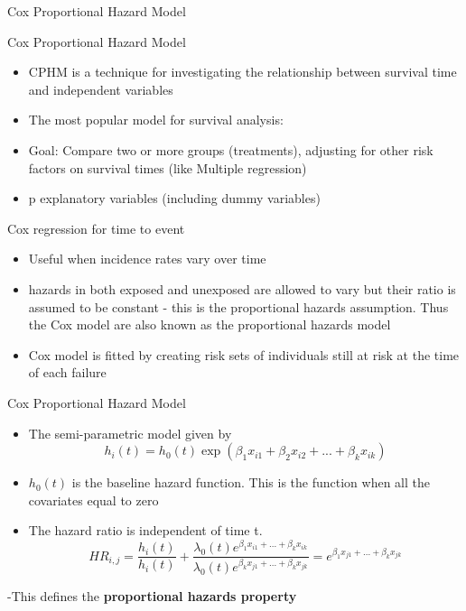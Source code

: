 \documentclass[ignorenonframetext,]{beamer}
\begin{document}
\begin{frame}{Cox Proportional Hazard Model}

\end{frame}

\begin{frame}{Cox Proportional Hazard Model}

\begin{itemize}
\itemsep1pt\parskip0pt
\item
  CPHM is a technique for investigating the relationship between
  survival time and independent variables
\item
  The most popular model for survival analysis:
\item
  Goal: Compare two or more groups (treatments), adjusting for other
  risk factors on survival times (like Multiple regression)
\item
  p explanatory variables (including dummy variables)
\end{itemize}

\end{frame}

\begin{frame}{Cox regression for time to event}

\begin{itemize}
\item
  Useful when incidence rates vary over time
\item
  hazards in both exposed and unexposed are allowed to vary but their
  ratio is assumed to be constant - this is the proportional hazards
  assumption. Thus the Cox model are also known as the proportional
  hazards model
\item
  Cox model is fitted by creating risk sets of individuals still at risk
  at the time of each failure
\end{itemize}

\end{frame}

\begin{frame}{Cox Proportional Hazard Model}

\begin{itemize}
\item
  The semi-parametric model given by \[
  h_i(t)=h_0(t)\exp(\beta_1 x_{i1} + \beta_2 x_{i2} + ... + \beta_k x_{ik})
  \]
\item
  \(h_0(t)\) is the baseline hazard function. This is the function when
  all the covariates equal to zero
\item
  The hazard ratio is independent of time t. \[
  HR_{i,j}=\frac{h_i(t)}{h_i(t)} +\frac{\lambda_0(t)e^{\beta_1 x_{i1} + ... + \beta_k x_{ik}}} { \lambda_0(t)e^{\beta_k x_{j1} + ... + \beta_k x_{jk}}} = e^{\beta_1 x_{j1} + ... + \beta_k x_{jk}}
  \]
\end{itemize}

-This defines the \textbf{proportional hazards property}

\end{frame}
\end{document}
